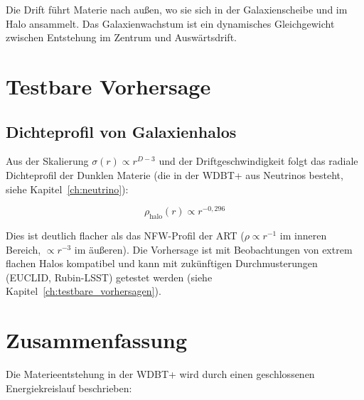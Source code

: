 Die Drift führt Materie nach außen, wo sie sich in der Galaxienscheibe und im Halo
ansammelt. Das Galaxienwachstum ist ein dynamisches Gleichgewicht zwischen
Entstehung im Zentrum und Auswärtsdrift.

\section{Testbare Vorhersage}
\label{app:materieentstehung_vorhersage}

\subsection{Dichteprofil von Galaxienhalos}
\label{sub:materieentstehung_halo}

Aus der Skalierung \( \sigma(r) \propto r^{D-3} \) und der Driftgeschwindigkeit
folgt das radiale Dichteprofil der Dunklen Materie (die in der WDBT+ aus Neutrinos
besteht, siehe Kapitel~\ref{ch:neutrino}):

\[
\boxed{\rho_{\text{halo}}(r) \propto r^{-0,296}}
\]

Dies ist deutlich flacher als das NFW-Profil der ART (\( \rho \propto r^{-1} \) im inneren
Bereich, \( \propto r^{-3} \) im äußeren). Die Vorhersage ist mit Beobachtungen
von extrem flachen Halos kompatibel und kann mit zukünftigen Durchmusterungen
(EUCLID, Rubin-LSST) getestet werden (siehe Kapitel~\ref{ch:testbare_vorhersagen}).

\section{Zusammenfassung}
\label{app:materieentstehung_zusammenfassung}

Die Materieentstehung in der WDBT+ wird durch einen geschlossenen Energiekreislauf
beschrieben:

